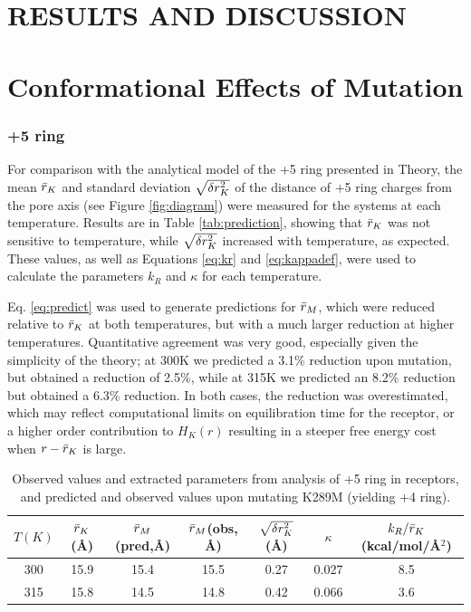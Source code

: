 \documentclass[9pt,twocolumn,twoside,lineno]{pnas-new}
\begin{document}
\section*{RESULTS AND DISCUSSION}
\section*{Conformational Effects of Mutation}
\subsubsection*{+5 ring}

For comparison with the analytical model of the +5 ring presented in Theory,  the mean $\bar{r}_{K}$ and standard deviation  $ \sqrt{\delta r^{2}_{K}} $ of the distance of +5 ring charges from the pore axis (see Figure \ref{fig:diagram})  were measured for the \WT systems at each temperature.  Results are in Table \ref{tab:prediction}, showing that $\bar{r}_{K}$ was not sensitive to temperature, while $\sqrt{\delta r^{2}_{K}}$ increased with temperature, as expected.  These values, as well as Equations \ref{eq:kr} and \ref{eq:kappadef}, were used to calculate the parameters $k_{R}$ and $\kappa$ for each temperature.  

Eq. \ref{eq:predict} was used to generate predictions for $\bar{r}_{M}$, which were reduced relative to $\bar{r}_{K}$ at both temperatures, but with a much larger reduction at higher temperatures.  Quantitative agreement was very good, especially given the simplicity of the theory; at 300K we predicted a 3.1\% reduction upon mutation, but obtained a reduction of 2.5\%, while at 315K we predicted an 8.2\% reduction but obtained a 6.3\% reduction.  In both cases, the reduction was overestimated, which may reflect computational limits on equilibration time for the \MT receptor, or a higher order contribution to $H_{K}(r)$ resulting in a steeper free energy cost when $r-\bar{r}_{K}$ is large.     

\begin{table}[htp]
\caption{\label{tab:prediction} Observed values and extracted parameters from analysis of +5 ring in \WT receptors, and predicted and observed values upon mutating K289M (yielding +4 ring).}
\begin{center}
\begin{adjustbox}{width=0.5\textwidth}
\small
\begin{tabular}{|c|c|c|c|c|c|c|}
$T (K) $& $\bar{r}_{K} $(\AA) &$\bar{r}_{M}$(pred,\AA)&  $\bar{r}_{M}$(obs, \AA)& $ \sqrt{\delta r^{2}_{K}} $ (\AA)& $\kappa$ & $k_{R}/\bar{r}_{K}$ (kcal/mol/\AA$^{2}$)\\
\hline
300 & 15.9 & 15.4 &  15.5 & 0.27 &  0.027&8.5 \\
315 & 15.8 &   14.5&  14.8& 0.42 &  0.066 &3.6
\end{tabular}
\end{adjustbox}
\end{center}
\label{default}
\end{table}%
\end{document}
